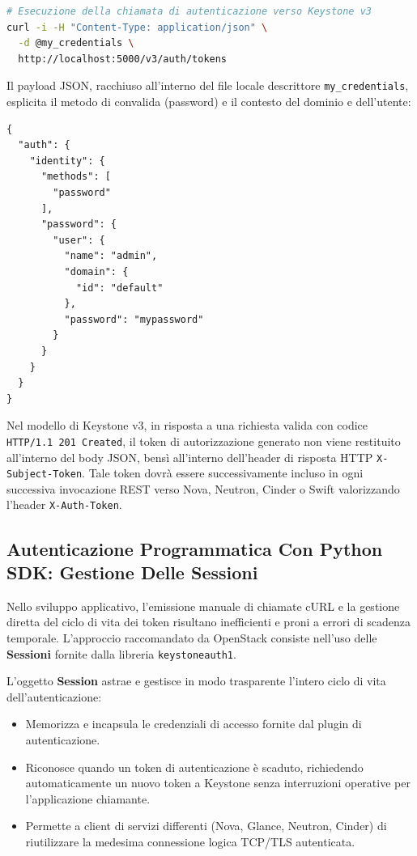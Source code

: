 \documentclass[11pt, a4paper]{article}
\begin{document}
\begin{lstlisting}[language=bash]
# Esecuzione della chiamata di autenticazione verso Keystone v3
curl -i -H "Content-Type: application/json" \
  -d @my_credentials \
  http://localhost:5000/v3/auth/tokens
\end{lstlisting}

Il payload JSON, racchiuso all'interno del file locale descrittore \texttt{my\_credentials}, esplicita il metodo di convalida (password) e il contesto del dominio e dell'utente:

\begin{lstlisting}
{
  "auth": {
    "identity": {
      "methods": [
        "password"
      ],
      "password": {
        "user": {
          "name": "admin",
          "domain": {
            "id": "default"
          },
          "password": "mypassword"
        }
      }
    }
  }
}
\end{lstlisting}

Nel modello di Keystone v3, in risposta a una richiesta valida con codice \texttt{HTTP/1.1 201 Created}, il token di autorizzazione generato non viene restituito all'interno del body JSON, bensì all'interno dell'header di risposta HTTP \texttt{X-Subject-Token}. Tale token dovrà essere successivamente incluso in ogni successiva invocazione REST verso Nova, Neutron, Cinder o Swift valorizzando l'header \texttt{X-Auth-Token}.

\subsection{Autenticazione Programmatica Con Python SDK: Gestione Delle Sessioni}

Nello sviluppo applicativo, l'emissione manuale di chiamate cURL e la gestione diretta del ciclo di vita dei token risultano inefficienti e proni a errori di scadenza temporale. L'approccio raccomandato da OpenStack consiste nell'uso delle \textbf{Sessioni} fornite dalla libreria \texttt{keystoneauth1}.

L'oggetto \textbf{Session} astrae e gestisce in modo trasparente l'intero ciclo di vita dell'autenticazione:
\begin{itemize}[noitemsep]
    \item Memorizza e incapsula le credenziali di accesso fornite dal plugin di autenticazione.
    \item Riconosce quando un token di autenticazione è scaduto, richiedendo automaticamente un nuovo token a Keystone senza interruzioni operative per l'applicazione chiamante.
    \item Permette a client di servizi differenti (Nova, Glance, Neutron, Cinder) di riutilizzare la medesima connessione logica TCP/TLS autenticata.
\end{itemize}
\end{document}
